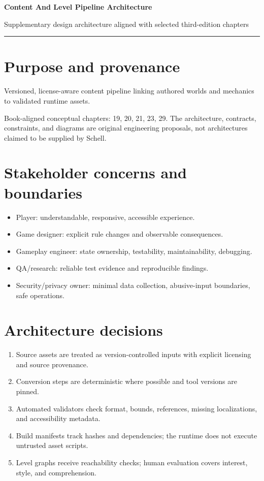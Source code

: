\documentclass[11pt]{article}
\begin{document}
{\huge\bfseries\color{suiteblue} Content And Level Pipeline Architecture}\par
\vspace{0.15in}
{\normalsize\color{suitegray} Supplementary design architecture aligned with selected third-edition chapters}\par
\vspace{0.15in}\hrule\vspace{0.15in}

\section{Purpose and provenance}
Versioned, license-aware content pipeline linking authored worlds and mechanics to validated runtime assets.

Book-aligned conceptual chapters: 19, 20, 21, 23, 29. The architecture, contracts, constraints, and diagrams are original engineering proposals, not architectures claimed to be supplied by Schell.


\section{Stakeholder concerns and boundaries}
\begin{itemize}
\item Player: understandable, responsive, accessible experience.
\item Game designer: explicit rule changes and observable consequences.
\item Gameplay engineer: state ownership, testability, maintainability, debugging.
\item QA/research: reliable test evidence and reproducible findings.
\item Security/privacy owner: minimal data collection, abusive-input boundaries, safe operations.
\end{itemize}

\section{Architecture decisions}
\begin{enumerate}
\item Source assets are treated as version-controlled inputs with explicit licensing and source provenance.
\item Conversion steps are deterministic where possible and tool versions are pinned.
\item Automated validators check format, bounds, references, missing localizations, and accessibility metadata.
\item Build manifests track hashes and dependencies; the runtime does not execute untrusted asset scripts.
\item Level graphs receive reachability checks; human evaluation covers interest, style, and comprehension.
\end{enumerate}
\end{document}
